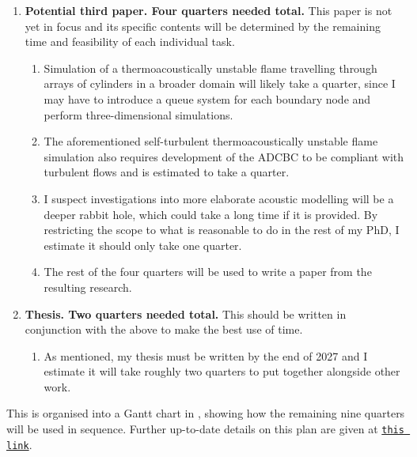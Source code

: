 \begin{enumerate}
\begin{enumerate}
    \end{enumerate}
\item \textbf{Potential third paper. Four quarters needed total.} This paper is not yet in focus and its specific contents will be determined by the remaining time and feasibility of each individual task.
    \begin{enumerate}
    \item Simulation of a thermoacoustically unstable flame travelling through arrays of cylinders in a broader domain will likely take a quarter, since I may have to introduce a queue system for each boundary node and perform three-dimensional simulations.
    \item The aforementioned self-turbulent thermoacoustically unstable flame simulation also requires development of the ADCBC to be compliant with turbulent flows and is estimated to take a quarter.
    \item I suspect investigations into more elaborate acoustic modelling will be a deeper rabbit hole, which could take a long time if it is provided. By restricting the scope to what is reasonable to do in the rest of my PhD, I estimate it should only take one quarter.
    \item The rest of the four quarters will be used to write a paper from the resulting research.
    \end{enumerate}
\item \textbf{Thesis. Two quarters needed total.} This should be written in conjunction with the above to make the best use of time.
    \begin{enumerate}
    \item As mentioned, my thesis must be written by the end of 2027 and I estimate it will take roughly two quarters to put together alongside other work.
    \end{enumerate}
\end{enumerate}
This is organised into a Gantt chart in , showing how the remaining nine quarters will be used in sequence. Further up-to-date details on this plan are given at \href{https://www.dropbox.com/scl/fi/4w62xppcfkywnr7nm8a6v/plan-Y3.md?rlkey=yx4ez0nmqjaabqseotnzfiqsn&st=lll313fe&dl=0}{\texttt{this link}}.


